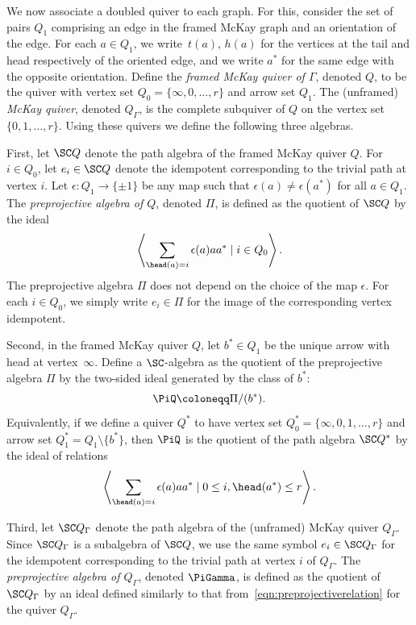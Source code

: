 We now associate a doubled quiver to each graph. For this, consider
the set of pairs $Q_1$ comprising an edge in the framed McKay graph
and an orientation of the edge. For each $a\in Q_1$, we write~$t(a)$,
$h(a)$ for the vertices at the tail and head respectively of
the oriented edge, and we write $a^{\ast}$ for the same edge with
the opposite orientation. Define the \emph{framed McKay quiver of $\Gamma$},
denoted $Q$, to be the quiver with vertex set $Q_0= \{\infty,0,\dots ,r\}$
and arrow set $Q_1$. The (unframed) \emph{McKay quiver},
denoted $Q_\Gamma$, is the complete subquiver of $Q$ on
the vertex set $\{0, 1,\dots, r\}$. Using these quivers
we define the following three algebras.

First, let $\SC Q$ denote the path algebra of the framed McKay quiver $Q$. For $i \in Q_0$, let $e_i \in \SC Q$ denote the idempotent corresponding to the trivial path at vertex $i$. Let $\epsilon\colon Q_1 \to \{\pm 1\}$ be any map such that $\epsilon(a) \neq \epsilon(a^{\ast})$ for all $a \in Q_1$. The \emph{preprojective algebra of $Q$}, denoted $\Pi$, is defined as the quotient of $\SC Q$ by the ideal
\begin{equation}
\label{eqn:preprojectiverelation}
\left\langle \sum_{\head(a)=i} \epsilon(a) aa^{\ast} \mid {i \in Q_0}
\right\rangle.
\end{equation}
 The preprojective algebra $\Pi$ does not depend on the choice of the map $\epsilon$. For each $i\in Q_0$, we simply write $e_i\in \Pi$ for the image of the corresponding vertex idempotent.

Second, in the framed McKay quiver $Q$, let $b^*\in Q_1$ be the unique arrow with head at vertex~$\infty$. Define a $\SC$-algebra as the quotient of the preprojective algebra $\Pi$ by the two-sided ideal generated by the class of $b^*$:
 \[
 \PiQ\coloneqq \Pi/(b^*).
 \]
 Equivalently, if we define a quiver $Q^*$ to have vertex set $Q^*_0=\{\infty,0,1,\dots,r\}$ and arrow set $Q_1^*=Q_1\setminus \{b^*\}$, then $\PiQ$ is the quotient of the path algebra $\SC Q^*$ by the ideal of relations
 \begin{equation*}%
 \left\langle \sum_{\head(a) = i} \epsilon(a) aa^* \mid 0\leq i,
 \head(a^*)\leq r \right\rangle.
 \end{equation*}

 Third, let $\SC Q_\Gamma$ denote the path algebra of the (unframed) McKay quiver $Q_\Gamma$. Since $\SC Q_\Gamma$ is a subalgebra of $\SC Q$, we use the same symbol $e_i\in \SC Q_\Gamma$ for the idempotent corresponding to the trivial path at vertex $i$ of $Q_\Gamma$. The \emph{preprojective algebra of $Q_\Gamma$}, denoted $\PiGamma$, is defined as the quotient of $\SC Q_\Gamma$ by an ideal defined similarly to that from~\eqref{eqn:preprojectiverelation} for the quiver $Q_\Gamma$.

